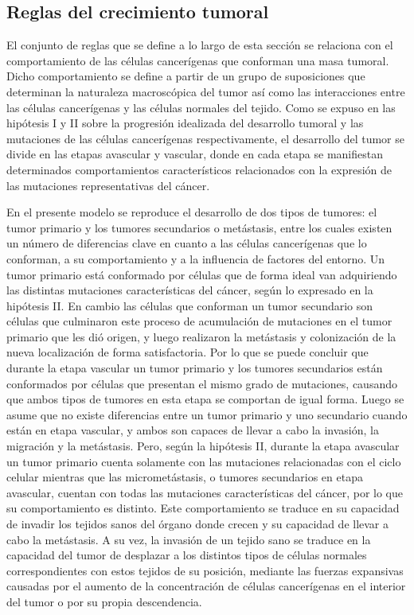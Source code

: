 \subsection{Reglas del crecimiento tumoral}
\label{subsec-celldiv}
El conjunto de reglas que se define a lo largo de esta secci\'on se relaciona con el comportamiento de las c\'elulas cancer\'igenas que conforman una masa tumoral. Dicho comportamiento se define a partir de un grupo de suposiciones que determinan la naturaleza macrosc\'opica del tumor as\'i como las interacciones entre las c\'elulas cancer\'igenas y las c\'elulas normales del tejido. Como se expuso en las hip\'otesis I y II sobre la progresi\'on idealizada del desarrollo tumoral y las mutaciones de las c\'elulas cancer\'igenas respectivamente, el desarrollo del tumor se divide en las etapas avascular y vascular, donde en cada etapa se manifiestan determinados comportamientos caracter\'isticos relacionados con la expresi\'on de las mutaciones representativas del c\'ancer. 

En el presente modelo se reproduce el desarrollo de dos tipos de tumores: el tumor primario y los tumores secundarios o met\'astasis, entre los cuales existen un n\'umero de diferencias clave en cuanto a las c\'elulas cancer\'igenas que lo conforman, a su comportamiento y a la influencia de factores del entorno. Un tumor primario est\'a conformado por c\'elulas que de forma ideal van adquiriendo las distintas mutaciones caracter\'isticas del c\'ancer, seg\'un lo expresado en la hip\'otesis II. En cambio las c\'elulas que conforman un tumor secundario son c\'elulas que culminaron este proceso de acumulaci\'on de mutaciones en el tumor primario que les di\'o origen, y luego realizaron la met\'astasis y colonizaci\'on de la nueva localizaci\'on de forma satisfactoria. Por lo que se puede concluir que durante la etapa vascular un tumor primario y los tumores secundarios est\'an conformados por c\'elulas que presentan el mismo grado de mutaciones, causando que ambos tipos de tumores en esta etapa se comportan de igual forma. Luego se asume que no existe diferencias entre un tumor primario y uno secundario cuando est\'an en etapa vascular, y ambos son capaces de llevar a cabo la invasi\'on, la migraci\'on y la met\'astasis. Pero, seg\'un la hip\'otesis II, durante la etapa avascular un tumor primario cuenta solamente con las mutaciones relacionadas con el ciclo celular mientras que las micromet\'astasis, o tumores secundarios en etapa avascular, cuentan con todas las mutaciones caracter\'isticas del c\'ancer, por lo que su comportamiento es distinto. Este comportamiento se traduce en su capacidad de invadir los tejidos sanos del \'organo donde crecen y su capacidad de llevar a cabo la met\'astasis. A su vez, la invasi\'on de un tejido sano se traduce en la capacidad del tumor de desplazar a los distintos tipos de c\'elulas normales correspondientes con estos tejidos de su posici\'on, mediante las fuerzas expansivas causadas por el aumento de la concentraci\'on de c\'elulas cancer\'igenas en el interior del tumor o por su propia descendencia. 

